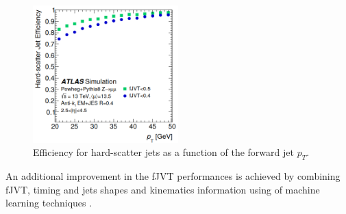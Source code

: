 \begin{figure}[H]
    \centering
    \includegraphics[width=0.5\textwidth]{Ch4/Img/fJVT_Eff.png}
    \caption{Efficiency for hard-scatter jets as a function of the forward jet $p_T$.}
    \label{fig:Jet:Tag:JVT:Eff}
\end{figure}
An additional improvement in the fJVT performances is achieved by combining fJVT, timing and jets shapes and kinematics information using of machine learning techniques \cite{Louis_Thesis}.   

